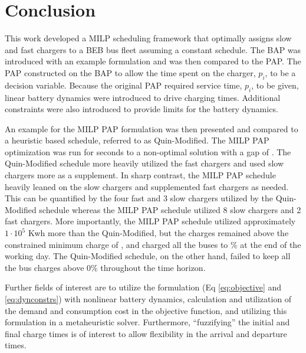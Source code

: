 \section{Conclusion}
\label{sec:conclusion}

This work developed a MILP scheduling framework that optimally assigns slow and fast chargers to a BEB bus fleet
assuming a constant schedule. The BAP was introduced with an example formulation and was then compared to the PAP. The
PAP constructed on the BAP to allow the time spent on the charger, $p_i$, to be a decision variable. Because the
original PAP required service time, $p_i$, to be given, linear battery dynamics were introduced to drive charging times.
Additional constraints were also introduced to provide limits for the battery dynamics.

An example for the MILP PAP formulation was then presented and compared to a heuristic based schedule, referred to as
Quin-Modified. The MILP PAP optimization was run for \timeran seconds to a non-optimal solution with a gap of
\gappercent. The Quin-Modified schedule more heavily utilized the fast chargers and used slow chargers more as a
supplement. In sharp contrast, the MILP PAP schedule heavily leaned on the slow chargers and supplemented fast chargers
as needed. This can be quantified by the four fast and 3 slow chargers utilized by the Quin-Modified schedule whereas
the MILP PAP schedule utilized 8 slow chargers and 2 fast chargers. More importantly, the MILP PAP schedule utilized
approximately $1\cdot10^5$ Kwh more than the Quin-Modified, but the charges remained above the constrained minimum charge of
\mincharge, and charged all the buses to \% at the end of the working day. The Quin-Modified
schedule, on the other hand, failed to keep all the bus charges above 0\% throughout the time horizon.

Further fields of interest are to utilize the formulation (Eq \eqref{eq:objective} and \eqref{eq:dynconstrs}) with
nonlinear battery dynamics, calculation and utilization of the demand and consumption cost in the objective function,
and utilizing this formulation in a metaheuristic solver. Furthermore, ``fuzzifying'' the initial and final charge times
is of interest to allow flexibility in the arrival and departure times.
